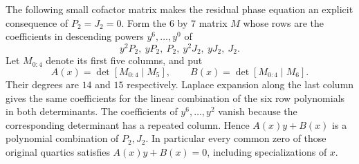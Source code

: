 The following small cofactor matrix makes the residual phase equation
an explicit consequence of $P_2=J_2=0$. Form the $6$ by $7$ matrix
$M$ whose rows are the coefficients in descending powers
$y^6,\ldots,y^0$ of
\[
               y^2P_2,\ yP_2,\ P_2,\ y^2J_2,\ yJ_2,\ J_2.
 \tag{ANP9}
\]
Let $M_{0:4}$ denote its first five columns, and put
\[
 A(x)=\det[M_{0:4}\mid M_5],\qquad
 B(x)=\det[M_{0:4}\mid M_6].
 \tag{ANP10}
\]
Their degrees are $14$ and $15$ respectively.
Laplace expansion along the last column gives the same coefficients
for the linear combination of the six row polynomials in both
determinants. The coefficients of $y^6,\ldots,y^2$ vanish because
the corresponding determinant has a repeated column. Hence
$A(x)y+B(x)$ is a polynomial combination of $P_2,J_2$.
In particular every common zero of those original quartics satisfies
$A(x)y+B(x)=0$, including specializations of $x$.

